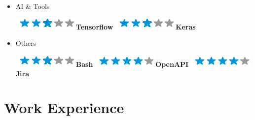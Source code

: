 \documentclass[]{friggeri-cv}
\begin{document}
\begin{flushleft}
\begin{multicols}{3}
\begin{itemize}
\item \large AI \& Tools \
\normalsize
\begin{flushleft}

\includegraphics[scale=0.40]{res/img/3stars.png}\hspace{1.5mm}\textbf{Tensorflow}
\includegraphics[scale=0.40]{res/img/3stars.png}\hspace{1.5mm}\textbf{Keras}
\end{flushleft}            

\item \large Others \
\normalsize
\begin{flushleft}

\includegraphics[scale=0.40]{res/img/3stars.png}\hspace{1.5mm}\textbf{Bash}
\includegraphics[scale=0.40]{res/img/4stars.png}\hspace{1.5mm}\textbf{OpenAPI}
\includegraphics[scale=0.40]{res/img/4stars.png}\hspace{1.5mm}\textbf{Jira}
\end{flushleft}            


        \end{itemize}
        \end{multicols}
        \end{flushleft} \normalsize
        \vspace*{-0.65cm}
\section{Work Experience}
\vspace*{-0.25cm}
\end{document}
